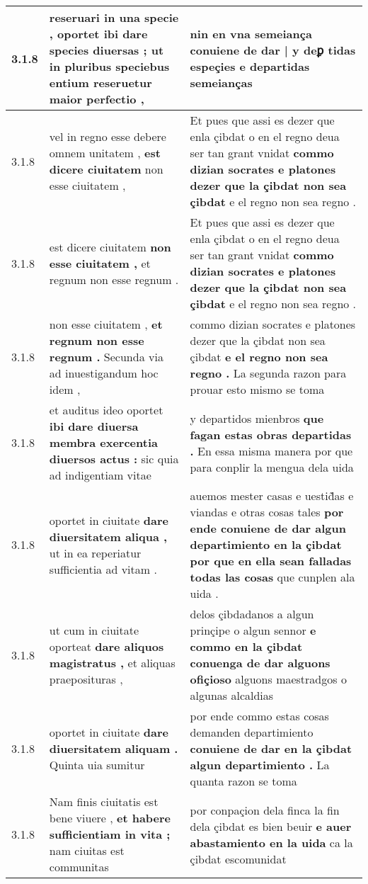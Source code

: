 \begin{tabular}{|p{1cm}|p{6.5cm}|p{6.5cm}|}
3.1.8 & reseruari in una specie , \textbf{ oportet ibi dare species diuersas ; } ut in pluribus speciebus entium reseruetur maior perfectio , & nin en vna semeiança \textbf{ conuiene de dar | y deꝑ tidas espeçies } e departidas semeianças \\\hline
3.1.8 & vel in regno esse debere omnem unitatem , \textbf{ est dicere ciuitatem } non esse ciuitatem , & Et pues que assi es dezer que enla çibdat o en el regno deua ser tan grant vnidat \textbf{ commo dizian socrates e platones dezer que la çibdat non sea çibdat } e el regno non sea regno . \\\hline
3.1.8 & est dicere ciuitatem \textbf{ non esse ciuitatem , } et regnum non esse regnum . & Et pues que assi es dezer que enla çibdat o en el regno deua ser tan grant vnidat \textbf{ commo dizian socrates e platones dezer que la çibdat non sea çibdat } e el regno non sea regno . \\\hline
3.1.8 & non esse ciuitatem , \textbf{ et regnum non esse regnum . } Secunda via ad inuestigandum hoc idem , & commo dizian socrates e platones dezer que la çibdat non sea çibdat \textbf{ e el regno non sea regno . } La segunda razon para prouar esto mismo se toma \\\hline
3.1.8 & et auditus ideo oportet \textbf{ ibi dare diuersa membra exercentia diuersos actus : } sic quia ad indigentiam vitae & y departidos mienbros \textbf{ que fagan estas obras departidas . } En essa misma manera por que para conplir la mengua dela uida \\\hline
3.1.8 & oportet in ciuitate \textbf{ dare diuersitatem aliqua , } ut in ea reperiatur sufficientia ad vitam . & auemos mester casas e uestid̃as e viandas e otras cosas tales \textbf{ por ende conuiene de dar algun departimiento en la çibdat por que en ella sean falladas todas las cosas } que cunplen ala uida . \\\hline
3.1.8 & ut cum in ciuitate oporteat \textbf{ dare aliquos magistratus , } et aliquas praeposituras , & delos çibdadanos a algun prinçipe o algun sennor \textbf{ e commo en la çibdat conuenga de dar alguons ofiçioso } alguons maestradgos o algunas alcaldias \\\hline
3.1.8 & oportet in ciuitate \textbf{ dare diuersitatem aliquam . } Quinta uia sumitur & por ende commo estas cosas demanden departimiento \textbf{ conuiene de dar en la çibdat algun departimiento . } La quanta razon se toma \\\hline
3.1.8 & Nam finis ciuitatis est bene viuere , \textbf{ et habere sufficientiam in vita ; } nam ciuitas est communitas & por conpaçion dela finca la fin dela çibdat es bien beuir \textbf{ e auer abastamiento en la uida } ca la çibdat escomunidat \\\hline

\end{tabular}
